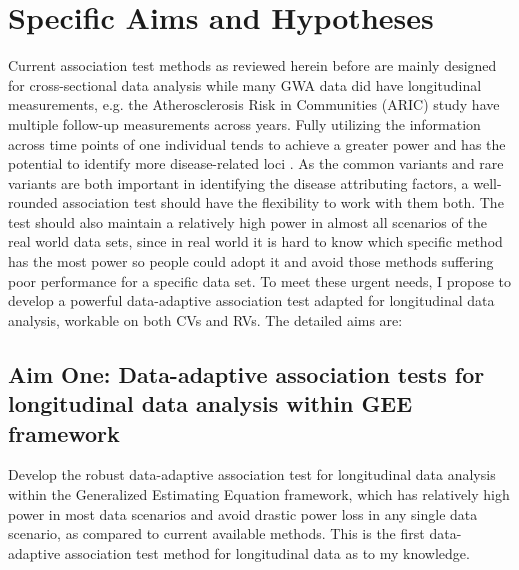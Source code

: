 \documentclass[12pt]{article}
\begin{document}
\section{Specific Aims and Hypotheses}\label{sec:aims}
Current association test methods as reviewed herein before are mainly designed for cross-sectional data analysis while many GWA data did have longitudinal measurements, e.g. the Atherosclerosis Risk in Communities (ARIC) study \cite{Chambless1997} have multiple follow-up measurements across years. Fully utilizing the information across time points of one individual tends to achieve a greater power and has the potential to identify more disease-related loci \cite{Furlotte2012,Xu2014}. As the common variants and rare variants are both important in identifying the disease attributing factors, a well-rounded association test should have the flexibility to work with them both. The test should also maintain a relatively high power in almost all scenarios of the real world data sets, since in real world it is hard to know which specific method has the most power so people could adopt it and avoid those methods suffering poor performance for a specific data set. To meet these urgent needs, I propose to develop a powerful data-adaptive association test adapted for longitudinal data analysis, workable on both CVs and RVs. The detailed aims are:
\subsection*{Aim One: Data-adaptive association tests for longitudinal data analysis within GEE framework}
Develop the robust data-adaptive association test for longitudinal data analysis within the Generalized Estimating Equation framework, which has relatively high power in most data scenarios and avoid drastic power loss in any single data scenario, as compared to current available methods. This is the first data-adaptive association test method for longitudinal data as to my knowledge.
\end{document}
